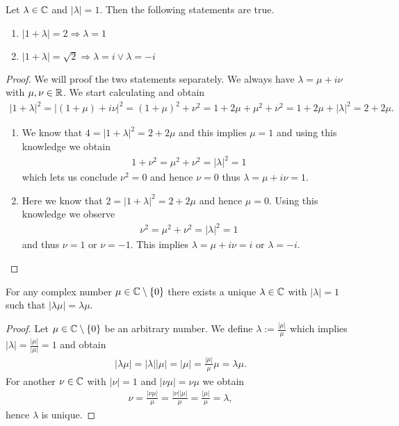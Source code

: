 \begin{lemma} \label{lemma:complex_geom}
	Let $\lambda \in \mathbb{C}$ and $|\lambda| = 1$. Then the following statements are true.
	\begin{enumerate}
		\item $|1 + \lambda| = 2 \Rightarrow \lambda = 1$
		\item $|1 + \lambda| = \sqrt{2} \Rightarrow \lambda = i \lor \lambda = -i$
	\end{enumerate}
\end{lemma}

\begin{proof}
	We will proof the two statements separately. We always have $\lambda = \mu + i \nu$ with $\mu, \nu \in \mathbb{R}$. We start calculating and obtain
	\begin{align*}
		|1 + \lambda|^2 = |(1 + \mu) + i \nu|^2 = (1 + \mu)^2 + \nu^2 = 1 + 2\mu + \mu^2 + \nu^2 = 1 + 2\mu + |\lambda|^2 = 2 + 2 \mu.
	\end{align*}
	\begin{enumerate}
		\item We know that $4 = |1 + \lambda|^2 = 2 + 2\mu$ and this implies $\mu = 1$ and using this knowledge we obtain
		\begin{align*}
			1 + \nu^2 = \mu^2 + \nu^2 = |\lambda|^2 = 1
		\end{align*}
		which lets us conclude $\nu^2 = 0$ and hence $\nu = 0$ thus $\lambda = \mu + i \nu = 1$. 
		
		\item Here we know that $2 = |1 + \lambda|^2 = 2 + 2\mu$ and hence $\mu = 0$. Using this knowledge we observe
		\begin{align*}
			\nu^2 = \mu^2 + \nu^2 = |\lambda|^2 = 1
		\end{align*}
		and thus $\nu = 1$ or $\nu = -1$. This implies $\lambda = \mu + i \nu = i$ or $\lambda = -i$.  
	\end{enumerate}
\end{proof}

\begin{lemma} \label{lemma:phase_adjustment_complex}
	For any complex number $\mu \in \mathbb{C} \setminus \{0\}$ there exists a unique $\lambda \in \mathbb{C}$ with $|\lambda| = 1$ such that $|\lambda \mu| = \lambda \mu$. 
\end{lemma}

\begin{proof}
	Let $\mu \in \mathbb{C} \setminus \{0\}$ be an arbitrary number. We define $\lambda := \frac{|\mu|}{\mu}$ which implies $|\lambda| = \frac{|\mu|}{|\mu|} = 1$ and obtain
	\begin{align*}
		|\lambda \mu| = |\lambda| |\mu| = |\mu| = \frac{|\mu|}{\mu} \mu = \lambda \mu.
	\end{align*}
	For another $\nu \in \mathbb{C}$ with $|\nu| = 1$ and $|\nu \mu| = \nu \mu$ we obtain
	\begin{align*}
		\nu = \frac{|\nu \mu|}{\mu} = \frac{|\nu| |\mu|}{\mu} = \frac{|\mu|}{\mu} = \lambda,
	\end{align*}
	hence $\lambda$ is unique. 
\end{proof}

